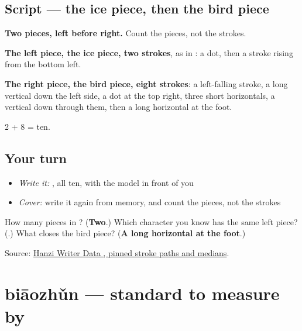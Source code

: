 \subsection*{Script — the ice piece, then the bird piece}

\begin{quote}
\end{quote}

\textbf{Two pieces, left before right.} Count the pieces, not the strokes.

\textbf{The left piece, the ice piece, two strokes}, as in : a dot, then a stroke rising from the bottom left.

\textbf{The right piece, the bird piece, eight strokes}: a left-falling stroke, a long vertical down the left side, a dot at the top right, three short horizontals, a vertical down through them, then a long horizontal at the foot.

2 + 8 = ten.

\subsection*{Your turn}
\begin{itemize}
\raggedright
  \item \emph{Write it:} , all ten, with the model in front of you
  \item \emph{Cover:} write it again from memory, and count the pieces, not the strokes
\end{itemize}

\begin{tcolorbox}[breakable,colback=teal!4,colframe=teal!35!black,title={Before you move on}]
How many pieces in ? (\textbf{Two}.) Which character you know has the same left piece? (\textbf{}.) What closes the bird piece? (\textbf{A long horizontal at the foot}.)

Source: \href{https://raw.githubusercontent.com/chanind/hanzi-writer-data/68d10a4b21150cae5e1ebbd223eed289cf32d90c/data/\%E5\%87\%86.json}{Hanzi Writer Data , pinned stroke paths and medians}.
\end{tcolorbox}
\section[biāozhǔn]{biāozhǔn — standard to measure by}

\label{lesson:ZH-C364-biaozhun}



